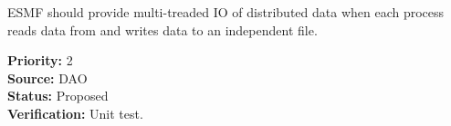 

ESMF should provide multi-treaded IO of distributed data when each
process reads data from and writes data to an independent file. 

\begin{reqlist}
{\bf Priority:} 2 \\
{\bf Source:} DAO \\
{\bf Status:} Proposed \\
{\bf Verification:} Unit test.
\end{reqlist}










